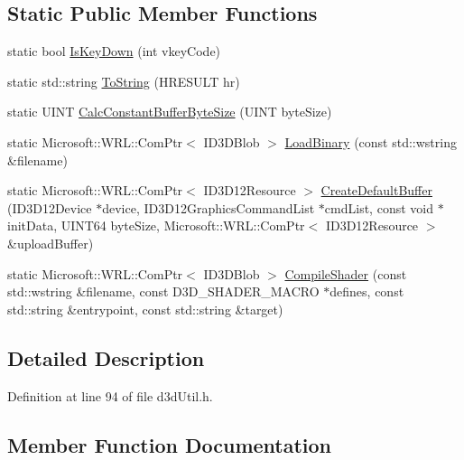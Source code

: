 \subsection*{Static Public Member Functions}
\begin{DoxyCompactItemize}
\item 
static bool \hyperlink{classd3d_util_a2e43ccad934a5f8de92c10de835e7d14_a2e43ccad934a5f8de92c10de835e7d14}{Is\+Key\+Down} (int vkey\+Code)
\item 
static std\+::string \hyperlink{classd3d_util_ae0b7d841076df11833db2564c86faefe_ae0b7d841076df11833db2564c86faefe}{To\+String} (H\+R\+E\+S\+U\+LT hr)
\item 
static U\+I\+NT \hyperlink{classd3d_util_a0883e0848cae813b2bc71570f3303e92_a0883e0848cae813b2bc71570f3303e92}{Calc\+Constant\+Buffer\+Byte\+Size} (U\+I\+NT byte\+Size)
\item 
static Microsoft\+::\+W\+R\+L\+::\+Com\+Ptr$<$ I\+D3\+D\+Blob $>$ \hyperlink{classd3d_util_a374c360bb2668c34223e74fbf0f1402b_a374c360bb2668c34223e74fbf0f1402b}{Load\+Binary} (const std\+::wstring \&filename)
\item 
static Microsoft\+::\+W\+R\+L\+::\+Com\+Ptr$<$ I\+D3\+D12\+Resource $>$ \hyperlink{classd3d_util_ae4a68e5b73f032619ee5c2db64f57899_ae4a68e5b73f032619ee5c2db64f57899}{Create\+Default\+Buffer} (I\+D3\+D12\+Device $\ast$device, I\+D3\+D12\+Graphics\+Command\+List $\ast$cmd\+List, const void $\ast$init\+Data, U\+I\+N\+T64 byte\+Size, Microsoft\+::\+W\+R\+L\+::\+Com\+Ptr$<$ I\+D3\+D12\+Resource $>$ \&upload\+Buffer)
\item 
static Microsoft\+::\+W\+R\+L\+::\+Com\+Ptr$<$ I\+D3\+D\+Blob $>$ \hyperlink{classd3d_util_acac6acd838913d63466e4f0159bfe8b0_acac6acd838913d63466e4f0159bfe8b0}{Compile\+Shader} (const std\+::wstring \&filename, const D3\+D\+\_\+\+S\+H\+A\+D\+E\+R\+\_\+\+M\+A\+C\+RO $\ast$defines, const std\+::string \&entrypoint, const std\+::string \&target)
\end{DoxyCompactItemize}


\subsection{Detailed Description}


Definition at line 94 of file d3d\+Util.\+h.



\subsection{Member Function Documentation}
